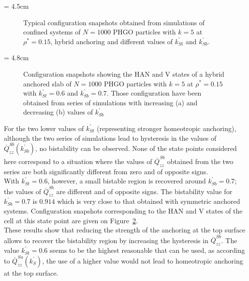 \picW = 4.5cm
\begin{figure}
	\centering
	
	
	\caption{Typical configuration snapshots obtained from simulations of confined systems of
	$N=1000$ PHGO particles with $k=5$ at $\rho^{*}=0.15$, hybrid anchoring and different 
	values of $k^\prime_{St}$ and $k^\prime_{Sb}$.}
	\label{fig:GBP_RSUP_hyb_typSnaps}
\end{figure}


\picW = 4.8cm
\begin{figure}
	\centering
	\caption{Configuration snapshots showing the HAN and V states of a hybrid anchored slab
	of $N=1000$ PHGO particles with $k=5$ at $\rho^{*} = 0.15$ with $k^\prime_{St} = 0.6$ 
	and $k^\prime_{Sb} = 0.7$. Those configuration have been obtained from series of 
	simulations with 
	increasing (a) and decreasing (b) values of $k^\prime_{Sb}$}
	\label{fig:GBP_RSUP_hyb_kSt060_kSt070_snaps}
\end{figure}


For the two lower values of $k^\prime_{St}$ (representing stronger homeotropic anchoring), 
although the two 
series of simulations lead to hysteresis in the values of $\overline{Q}^{Sb}_{zz}(k^\prime_{Sb})$, no
bistability can be observed. None of the state points considered here correspond to a situation 
where the values of $\overline{Q}^{Sb}_{zz}$ obtained from the two series are both significantly
different from zero and of opposite signs.\\
%
With $k^\prime_{St} = 0.6$, however, a small bistable region  is recovered around
$k^\prime_{Sb}= 0.7$; 
the values of $\overline{Q}^{Sb}_{zz}$ are different and of opposite signs. The bistability value for 
$k^\prime_{Sb} = 0.7$ is $0.914$ which is very close to that obtained with symmetric anchored 
systems. Configuration snapshots corresponding to the HAN and V states
of the cell at this state point are given on Figure~\ref{fig:GBP_RSUP_hyb_kSt060_kSt070_snaps}.\\
%
These results show that reducing the strength of the anchoring at the top surface allows to
recover the bistability region by increasing the hysteresis in $\overline{Q}^{Sb}_{zz}$.
The value $k^\prime_{St} = 0.6$ seems to be the highest reasonable that can be used,
as according to $\overline{Q}^{Su}_{zz}(k^\prime_S)$, the use of a higher value would not lead to homeotropic
anchoring at the top surface.\\


